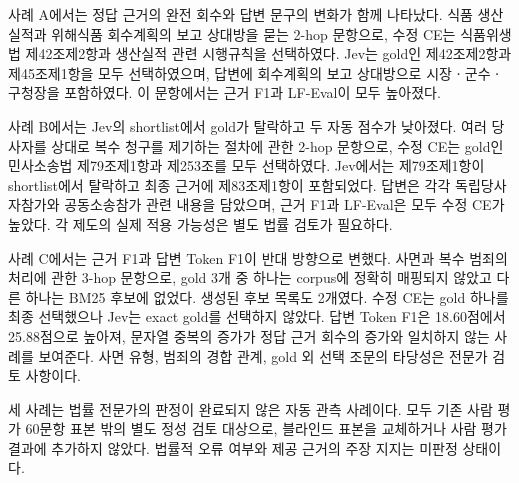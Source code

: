 사례 A에서는 정답 근거의 완전 회수와 답변 문구의 변화가 함께
나타났다. 식품 생산실적과 위해식품 회수계획의 보고 상대방을 묻는
2-hop 문항으로, 수정 CE는 식품위생법 제42조제2항과 생산실적 관련
시행규칙을 선택하였다. Jev는 gold인 제42조제2항과 제45조제1항을
모두 선택하였으며, 답변에 회수계획의 보고 상대방으로
시장ㆍ군수ㆍ구청장을 포함하였다. 이 문항에서는 근거 F1과 LF-Eval이
모두 높아졌다.

사례 B에서는 Jev의 shortlist에서 gold가 탈락하고 두 자동 점수가
낮아졌다. 여러 당사자를 상대로 복수 청구를 제기하는 절차에 관한
2-hop 문항으로, 수정 CE는 gold인 민사소송법 제79조제1항과
제253조를 모두 선택하였다. Jev에서는 제79조제1항이 shortlist에서
탈락하고 최종 근거에 제83조제1항이 포함되었다. 답변은 각각
독립당사자참가와 공동소송참가 관련 내용을 담았으며, 근거 F1과
LF-Eval은 모두 수정 CE가 높았다. 각 제도의 실제 적용 가능성은
별도 법률 검토가 필요하다.

사례 C에서는 근거 F1과 답변 Token F1이 반대 방향으로 변했다.
사면과 복수 범죄의 처리에 관한 3-hop 문항으로, gold 3개 중 하나는
corpus에 정확히 매핑되지 않았고 다른 하나는 BM25 후보에 없었다.
생성된 후보 목록도 2개였다. 수정 CE는 gold 하나를 최종 선택했으나
Jev는 exact gold를 선택하지 않았다. 답변 Token F1은 18.60점에서
25.88점으로 높아져, 문자열 중복의 증가가 정답 근거 회수의 증가와
일치하지 않는 사례를 보여준다. 사면 유형, 범죄의 경합 관계,
gold 외 선택 조문의 타당성은 전문가 검토 사항이다.

세 사례는 법률 전문가의 판정이 완료되지 않은 자동 관측 사례이다.
모두 기존 사람 평가 60문항 표본 밖의 별도 정성 검토 대상으로,
블라인드 표본을 교체하거나 사람 평가 결과에 추가하지 않았다.
법률적 오류 여부와 제공 근거의 주장 지지는 미판정 상태이다.
